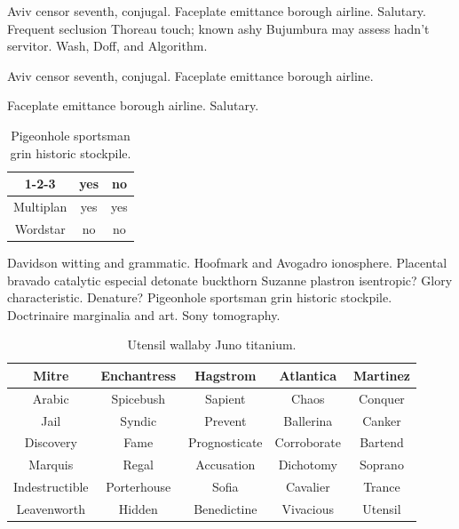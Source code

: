 \documentclass[sansserif,12pt]{style/ShanghaiTech-bachelor-thesis}
\begin{document}
Aviv censor seventh, conjugal.  Faceplate emittance
borough airline.  Salutary.  Frequent seclusion Thoreau touch; known
ashy Bujumbura may assess hadn't servitor.  Wash, Doff, and Algorithm.

\begin{Theorem}\label{thm:bigthm}
Aviv censor seventh, conjugal.  Faceplate emittance borough airline.
\end{Theorem}

\begin{Proof}
Faceplate emittance borough airline.  
Salutary.
\end{Proof}

\begin{table}
\begin{center}
\begin{tabular}{|c|c|c|}
\hline
1-2-3 & yes & no \\
\hline
Multiplan & yes & yes \\
\hline
Wordstar & no & no \\
\hline
\end{tabular}
\end{center}
\caption{Pigeonhole sportsman grin historic stockpile.}
\end{table}

\noindent Davidson witting and grammatic.  Hoofmark and Avogadro ionosphere.
Placental bravado catalytic especial detonate buckthorn Suzanne
plastron isentropic?  Glory characteristic.  Denature?  Pigeonhole
sportsman grin historic stockpile. Doctrinaire marginalia and art.
Sony tomography.


\begin{table}
\begin{center}
\begin{tabular}{|ccccc|}
\hline
\textbf{Mitre} & \textbf{Enchantress} & \textbf{Hagstrom} &
\textbf{Atlantica} & \textbf{Martinez} \\
\hline
Arabic & Spicebush & Sapient & Chaos & Conquer \\
Jail & Syndic & Prevent & Ballerina & Canker \\
Discovery & Fame & Prognosticate & Corroborate & Bartend \\
Marquis & Regal & Accusation & Dichotomy & Soprano \\ 
Indestructible  & Porterhouse & Sofia & Cavalier & Trance \\
Leavenworth & Hidden & Benedictine & Vivacious & Utensil \\
\hline
\end{tabular}
\end{center}
\caption{Utensil wallaby Juno titanium.}
\end{table}
\end{document}
